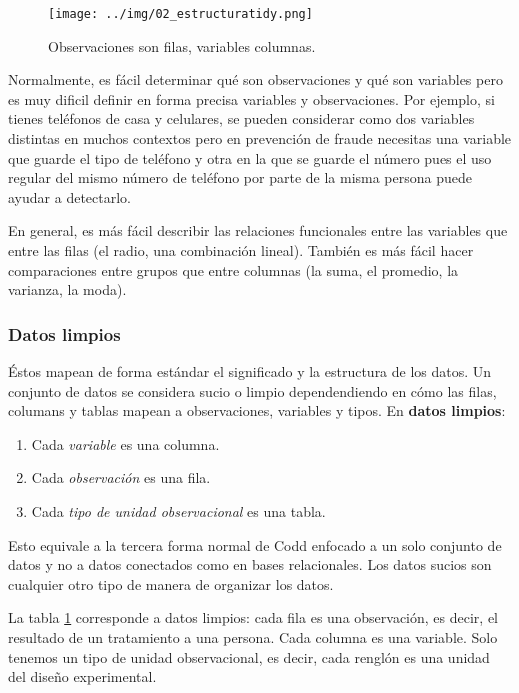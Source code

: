 \documentclass[]{article}
\providecommand{\tightlist}{%
  \setlength{\itemsep}{0pt}\setlength{\parskip}{0pt}}
\begin{document}
\begin{figure}[h]
    \centering
    \texttt{[image: ../img/02\_estructuratidy.png]}
    \caption{Observaciones son filas, variables columnas.}
    \label{fig:estructuratidy}
\end{figure}

Normalmente, es fácil determinar qué son observaciones y qué son
variables pero es muy dificil definir en forma precisa variables y
observaciones. Por ejemplo, si tienes teléfonos de casa y celulares, se
pueden considerar como dos variables distintas en muchos contextos pero
en prevención de fraude necesitas una variable que guarde el tipo de
teléfono y otra en la que se guarde el número pues el uso regular del
mismo número de teléfono por parte de la misma persona puede ayudar a
detectarlo.

En general, es más fácil describir las relaciones funcionales entre las
variables que entre las filas (el radio, una combinación lineal).
También es más fácil hacer comparaciones entre grupos que entre columnas
(la suma, el promedio, la varianza, la moda).

\subsubsection{Datos limpios}\label{datos-limpios-1}

Éstos mapean de forma estándar el significado y la estructura de los
datos. Un conjunto de datos se considera sucio o limpio dependendiendo
en cómo las filas, columans y tablas mapean a observaciones, variables y
tipos. En \textbf{datos limpios}:

\begin{enumerate}
\def\labelenumi{\arabic{enumi}.}
\tightlist
\item
  Cada \emph{variable} es una columna.
\item
  Cada \emph{observación} es una fila.
\item
  Cada \emph{tipo de unidad observacional} es una tabla.
\end{enumerate}

Esto equivale a la tercera forma normal de Codd enfocado a un solo
conjunto de datos y no a datos conectados como en bases relacionales.
Los datos sucios son cualquier otro tipo de manera de organizar los
datos.

La tabla \ref{fig:estructuratidy} corresponde a datos limpios: cada fila
es una observación, es decir, el resultado de un tratamiento a una
persona. Cada columna es una variable. Solo tenemos un tipo de unidad
observacional, es decir, cada renglón es una unidad del diseño
experimental.
\end{document}
